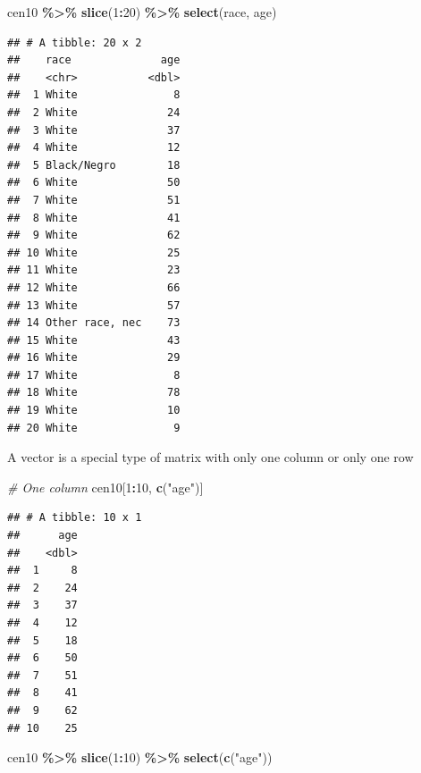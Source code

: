 \documentclass[
]{book}
\newenvironment{Shaded}{\begin{snugshade}}{\end{snugshade}}
\newcommand{\CommentTok}[1]{\textcolor[rgb]{0.56,0.35,0.01}{\textit{#1}}}
\newcommand{\DecValTok}[1]{\textcolor[rgb]{0.00,0.00,0.81}{#1}}
\newcommand{\KeywordTok}[1]{\textcolor[rgb]{0.13,0.29,0.53}{\textbf{#1}}}
\newcommand{\NormalTok}[1]{#1}
\newcommand{\OperatorTok}[1]{\textcolor[rgb]{0.81,0.36,0.00}{\textbf{#1}}}
\newcommand{\StringTok}[1]{\textcolor[rgb]{0.31,0.60,0.02}{#1}}
\theoremstyle{definition}
\theoremstyle{definition}
\theoremstyle{definition}
\theoremstyle{remark}
\begin{document}
\begin{Shaded}
\begin{Highlighting}[]
\NormalTok{cen10 }\OperatorTok{\%>\%}\StringTok{ }\KeywordTok{slice}\NormalTok{(}\DecValTok{1}\OperatorTok{:}\DecValTok{20}\NormalTok{) }\OperatorTok{\%>\%}\StringTok{ }\KeywordTok{select}\NormalTok{(race, age)}
\end{Highlighting}
\end{Shaded}

\begin{verbatim}
## # A tibble: 20 x 2
##    race              age
##    <chr>           <dbl>
##  1 White               8
##  2 White              24
##  3 White              37
##  4 White              12
##  5 Black/Negro        18
##  6 White              50
##  7 White              51
##  8 White              41
##  9 White              62
## 10 White              25
## 11 White              23
## 12 White              66
## 13 White              57
## 14 Other race, nec    73
## 15 White              43
## 16 White              29
## 17 White               8
## 18 White              78
## 19 White              10
## 20 White               9
\end{verbatim}

A vector is a special type of matrix with only one column or only one row

\begin{Shaded}
\begin{Highlighting}[]
\CommentTok{\# One column}
\NormalTok{cen10[}\DecValTok{1}\OperatorTok{:}\DecValTok{10}\NormalTok{, }\KeywordTok{c}\NormalTok{(}\StringTok{"age"}\NormalTok{)]}
\end{Highlighting}
\end{Shaded}

\begin{verbatim}
## # A tibble: 10 x 1
##      age
##    <dbl>
##  1     8
##  2    24
##  3    37
##  4    12
##  5    18
##  6    50
##  7    51
##  8    41
##  9    62
## 10    25
\end{verbatim}

\begin{Shaded}
\begin{Highlighting}[]
\NormalTok{cen10 }\OperatorTok{\%>\%}\StringTok{ }\KeywordTok{slice}\NormalTok{(}\DecValTok{1}\OperatorTok{:}\DecValTok{10}\NormalTok{) }\OperatorTok{\%>\%}\StringTok{ }\KeywordTok{select}\NormalTok{(}\KeywordTok{c}\NormalTok{(}\StringTok{"age"}\NormalTok{))}
\end{Highlighting}
\end{Shaded}
\end{document}
